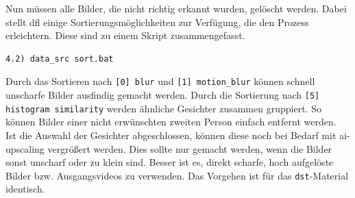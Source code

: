 Nun müssen alle Bilder, die nicht richtig erkannt wurden, gelöscht werden.
Dabei stellt \gls{dfl} einige Sortierungsmöglichkeiten zur Verfügung, die den Prozess erleichtern.
Diese sind zu einem Skript zusammengefasst.
\begin{lstlisting}[label={lst:extraction-4},numbers=none]
    4.2) data_src sort.bat
\end{lstlisting}
Durch das Sortieren nach \texttt{[0] blur} und \texttt{[1] motion\_blur} können schnell unscharfe Bilder ausfindig gemacht werden.
Durch die Sortierung nach \texttt{[5] histogram similarity} werden ähnliche Gesichter zusammen gruppiert.
So können Bilder einer nicht erwünschten zweiten Person einfach entfernt werden.\\
Ist die Auswahl der Gesichter abgeschlossen, können diese noch bei Bedarf mit \gls{ai-upscaling} vergrößert werden.
Dies sollte nur gemacht werden, wenn die Bilder sonst unscharf oder zu klein sind.
Besser ist es, direkt scharfe, hoch aufgelöste Bilder bzw. Ausgangsvideos zu verwenden.
Das Vorgehen ist für das \texttt{dst}-Material identisch.

